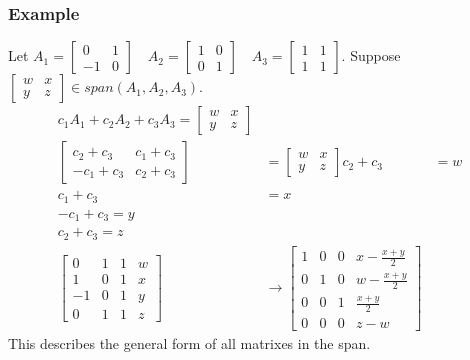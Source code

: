 \documentclass[letterpaper, 12pt]{math}
\begin{document}
\subsubsection*{Example}
Let \( A_1 = \begin{bmatrix}0 & 1 \\ -1 & 0\end{bmatrix} \quad
  A_2 = \begin{bmatrix}1 & 0 \\ 0 & 1\end{bmatrix} \quad
  A_3 = \begin{bmatrix}1 & 1 \\ 1 & 1\end{bmatrix} \). Suppose
\( \begin{bmatrix}w & x \\ y & z\end{bmatrix}\in span(A_1,A_2,A_3) \).
\begin{align*}
  c_1A_1+c_2A_2+c_3A_3 = \begin{bmatrix}
    w & x \\
    y & z
  \end{bmatrix} \\
  \begin{bmatrix}
    c_2+c_3 & c_1+c_3 \\
    -c_1+c_3 & c_2+c_3
  \end{bmatrix} &= \begin{bmatrix}
    w & x \\
    y & z
  \end{bmatrix}
  c_2+c_3 &= w \\
  c_1+c_3 &= x \\
  -c_1+c_3 = y \\
  c_2+c_3 = z \\
  \left[\begin{array}{ccc|c}
    0 & 1 & 1 & w \\
    1 & 0 & 1 & x \\
    -1 & 0 & 1 & y \\
    0 & 1 & 1 & z
  \end{array}\right] &\to \left[\begin{array}{ccc|c}
    1 & 0 & 0 & x-\frac{x+y}{2} \\
    0 & 1 & 0 & w-\frac{x+y}{2} \\
    0 & 0 & 1 & \frac{x+y}{2} \\
    0 & 0 & 0 & z-w
  \end{array}\right]
\end{align*}
This describes the general form of all matrixes in the span.
\end{document}
